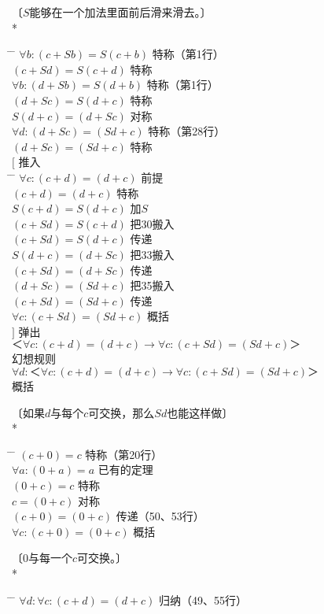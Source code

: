\begin{center}
〔$S$能够在一个加法里面前后滑来滑去。〕\\
* \quad * \quad * \quad * \quad *
\end{center}
\begin{tabbing*}[]
\qquad\qquad \= \tabindent{-2em} \= \+\kill
$\forall b:(c+Sb)=S(c+b)$ \>特称（第1行）\\
$(c+Sd)=S(c+d)$ \>特称\\
$\forall b:(d+Sb)=S(d+b)$ \>特称（第1行）\\
$(d+Sc)=S(d+c)$ \>特称\\
$S(d+c)=(d+Sc)$ \>对称\\
$\forall d:(d+Sc)=(Sd+c)$ \>特称（第28行）\\
$(d+Sc)=(Sd+c)$ \>特称\\
$[$ \>推入\\
\pushtabs
  \quad \= \tabindent{-1em} \= \+\kill
  $\forall c:(c+d)=(d+c)$ \>前提\\
  $(c+d)=(d+c)$ \>特称\\
  $S(c+d)=S(d+c)$ \>加$S$\\
  $(c+Sd)=S(c+d)$ \>把30搬入\\
  $(c+Sd)=S(d+c)$ \>传递\\
  $S(d+c)=(d+Sc)$ \>把33搬入\\
  $(c+Sd)=(d+Sc)$ \>传递\\
  $(d+Sc)=(Sd+c)$ \>把35搬入\\
  $(c+Sd)=(Sd+c)$ \>传递\\
  $\forall c:(c+Sd)=(Sd+c)$ \>概括\-\\
\poptabs
$]$ \>弹出\\
$＜\forall c:(c+d)=(d+c)→\forall c:(c+Sd)=(Sd+c)＞$\\
  \>幻想规则\nonumber\\
$\forall d:＜\forall c:(c+d)=(d+c)→\forall c:(c+Sd)=(Sd+c)＞$\\
  \>概括\nonumber
\end{tabbing*}
\begin{center}
〔如果$d$与每个$c$可交换，那么$Sd$也能这样做〕\\
* \quad * \quad * \quad * \quad *
\end{center}
\begin{tabbing*}[]
\qquad\qquad \= \tabindent{-2em} \= \+\kill
$(c+0)=c$ \>特称（第20行）\\
$\forall a:(0+a)=a$ \>已有的定理\\
$(0+c)=c$ \>特称\\
$c=(0+c)$ \>对称\\
$(c+0)=(0+c)$ \>传递（50、53行）\\
$\forall c:(c+0)=(0+c)$ \>概括
\end{tabbing*}
\begin{center}
〔$0$与每一个$c$可交换。〕\\
* \quad * \quad * \quad * \quad *
\end{center}
\begin{tabbing*}[]
\qquad\qquad \= \tabindent{-2em} \= \+\kill
$\forall d:\forall c:(c+d)=(d+c)$ \>归纳（49、55行）
\end{tabbing*}


